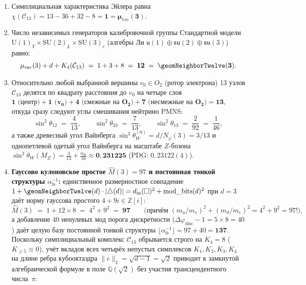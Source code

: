 \begin{enumerate}[label=\textbf{\arabic*.},noitemsep]
\item Симплициальная характеристика Эйлера равна $\chi(\mathcal{C}_{13}) = 13 - 36 + 32 - 8 = \mathbf{1 = \mu_{\mathrm{vac}}(3)}$.
\item Число независимых генераторов калибровочной группы Стандартной модели $\mathrm{U}(1)_Y\times\mathrm{SU}(2)_L\times\mathrm{SU}(3)_c$ (алгебры Ли $\mathfrak{u}(1)\oplus\mathfrak{su}(2)\oplus\mathfrak{su}(3)$) равно:
  \[
    \mu_{\mathrm{vac}}(3) + d + K_4(\mathcal{C}_{13}) \;=\; 1 + 3 + 8 \;=\; \mathbf{12 \;=\; \geomNeighborTwelve(3)}.
  \]
\item Относительно любой выбранной вершины $v_0\in O_2$ (ротор электрона) 13 узлов $\mathcal{C}_{13}$ делятся по квадрату расстояния до $v_0$ на четыре слоя $\mathbf{1\text{ (центр)} + 1\text{ ($v_0$)} + 4\text{ (смежные на $O_2$)} + 7\text{ (несмежные на $O_2$)} = 13}$, откуда сразу следуют углы смешивания нейтрино PMNS:
  \[
    \sin^2\theta_{12} \;=\; \frac{4}{13}, \qquad \sin^2\theta_{23} \;=\; \frac{7}{13}, \qquad \sin^2\theta_{13} \;=\; \frac{2}{92} \;=\; \frac{1}{46},
  \]
  а также древесный угол Вайнберга $\sin^2\theta_W^{(0)} = d / N_\varphi(3) = 3/13$ и однопетлевой одетый угол Вайнберга на масштабе $Z$-бозона $\sin^2\theta_W(M_Z) = \frac{3}{13} + \frac{\alpha_{\mathrm{fs}}}{16} \approx \mathbf{0{,}231225}$ (PDG: $0{,}23122(4)$).
\item \textbf{Гауссово кулоновское простое $\hat{M}(3) = 97$ и постоянная тонкой структуры $\alpha_{\mathrm{fs}}^{-1}$:}
  единственное размерностное совпадение $1 + \geomNeighborTwelve(d)\cdot |{\triangle}(d)| = d_{\mathrm{in}}(\square)^2 + \mathrm{mod\_bits}(d)^2$ при $d=3$ даёт норму гауссова простого $4 + 9i\in\mathbb{Z}[i]$:
  \[
    \hat{M}(3) \;=\; 1 + 12\times 8 \;=\; 4^2 + 9^2 \;=\; \mathbf{97}
    \qquad \bigl(\text{причём } (m_u/m_e)^2 + (m_d/m_e)^2 = 4^2 + 9^2 = 97!\bigr),
  \]
  а добавление 40 ненулевых мод порога дискретности ($\Delta\varphi_{\mathrm{disc}} - 1 = 5\times 8 = 40$) даёт целую базу постоянной тонкой структуры $\lfloor\alpha_{\mathrm{fs}}^{-1}\rfloor = 97 + 40 = \mathbf{137}$. Поскольку симплициальный комплекс $\mathcal{C}_{13}$ обрывается строго на $K_4 = 8$ ($K_{\ge 5} \equiv 0$), учёт вкладов всех четырёх непустых симплексов $K_1, K_2, K_3, K_4$ на длине ребра кубооктаэдра $\|e\|_2 = \sqrt{d-1} = \sqrt{2}$ приводит к замкнутой алгебраической формуле в поле $\mathbb{Q}(\sqrt{2})$ без участия трансцендентного числа~$\pi$:
  \begin{equation}

\end{equation}
\end{enumerate}
